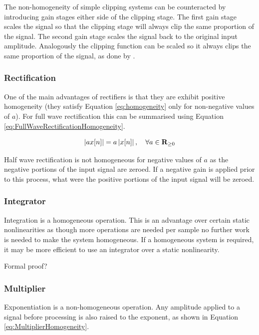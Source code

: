 			The non-homogeneity of simple clipping systems can be counteracted by introducing gain stages
			either side of the clipping stage. The first gain stage scales the signal so that the clipping
			stage will always clip the same proportion of the signal. The second gain stage scales the signal
			back to the original input amplitude. Analogously the clipping function can be scaled so it
			always clips the same proportion of the signal, as done by \citet{deman2014adaptive}.

		\subsubsection*{Rectification}
			One of the main advantages of rectifiers is that they are exhibit positive homogeneity (they
			satisfy Equation \ref{eq:homogeneity} only for non-negative values of $a$). For full wave
			rectification this can be summarised using Equation \ref{eq:FullWaveRectificationHomogeneity}.

			\begin{equation}
				\left|ax[n]\right| = a\left|x[n]\right|, \quad \forall a \in \textbf{R}_{\geq 0}
				\label{eq:FullWaveRectificationHomogeneity}
			\end{equation}

			Half wave rectification is not homogeneous for negative values of $a$ as the negative portions of
			the input signal are zeroed. If a negative gain is applied prior to this process, what were the
			positive portions of the input signal will be zeroed.

		\subsubsection*{Integrator}
			Integration is a homogeneous operation. This is an advantage over certain static nonlinearities as
			though more operations are needed per sample no further work is needed to make the system
			homogeneous. If a homogeneous system is required, it may be more efficient to use an integrator
			over a static nonlinearity.
		
			\note
			{
				Formal proof?
			}

		\subsubsection*{Multiplier}
			Exponentiation is a non-homogeneous operation. Any amplitude applied to a signal before processing
			is also raised to the exponent, as shown in Equation \ref{eq:MultiplierHomogeneity}.

